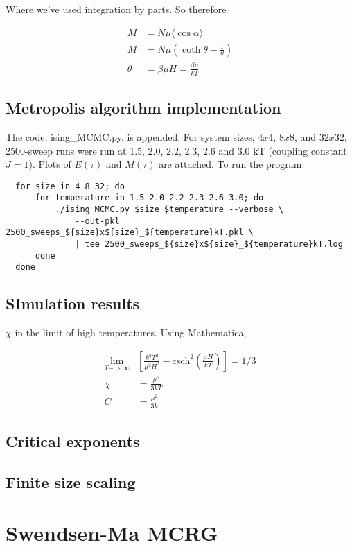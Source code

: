 \documentclass[11pt, letterpaper]{scrartcl} %
\numberwithin{equation}{section} %
\numberwithin{figure}{section} %
\numberwithin{table}{section} %
\begin{document}
Where we've used integration by parts. So therefore

\begin{align}
  M &= N\mu \langle {\cos \alpha} \rangle\\
  M &= N\mu(\coth \theta - \frac{1}{\theta})\\
  \theta &= \beta \mu H = \frac{\beta\mu}{kT}
\end{align}

\subsection{Metropolis algorithm implementation}

The code, ising_MCMC.py, is appended. For system sizes, $4x4$, $8x8$,
and $32x32$, 2500-sweep runs were run at 1.5, 2.0, 2.2, 2.3, 2.6 and
3.0 kT (coupling constant $J=1$). Plots of $E(\tau)$ and $M(\tau)$ are
attached. To run the program:

\begin{lstlisting}
  for size in 4 8 32; do
      for temperature in 1.5 2.0 2.2 2.3 2.6 3.0; do
          ./ising_MCMC.py $size $temperature --verbose \
              --out-pkl 2500_sweeps_${size}x${size}_${temperature}kT.pkl \
              | tee 2500_sweeps_${size}x${size}_${temperature}kT.log
      done
  done
\end{lstlisting}


\subsection{SImulation results}

$\chi$ in the limit of high temperatures. Using Mathematica,

\begin{align}
  \lim_{T->\infty} &\left[\frac{k^2T^2}{\mu^2H^2} - \text{csch}^2(\frac{\mu H}{kT})\right] = 1/3\\
                  \chi &= \frac{\mu^2 }{3kT}\\
                         C &= \frac{\mu^2}{3k}
\end{align}

\subsection{Critical exponents}


\subsection{Finite size scaling}


\section{Swendsen-Ma MCRG}


\end{document}
